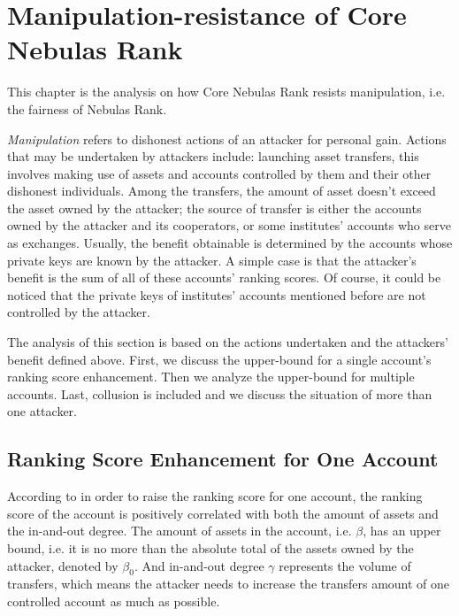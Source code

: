 
\section{Manipulation-resistance of Core Nebulas Rank}

This chapter is the analysis on how Core Nebulas Rank resists manipulation, i.e. the fairness of Nebulas Rank.

\emph{Manipulation} refers to dishonest actions of an attacker for personal gain. Actions that may be undertaken by attackers include: launching asset transfers, this involves making use of assets and accounts controlled by them and their other dishonest individuals. Among the transfers, the amount of asset doesn't exceed the asset owned by the attacker; the source of transfer is either the accounts owned by the attacker and its cooperators, or some institutes' accounts who serve as exchanges. Usually, the benefit obtainable is determined by the accounts whose private keys are known by the attacker. A simple case is that the attacker's benefit is the sum of all of these accounts' ranking scores. Of course, it could be noticed that the private keys of institutes' accounts mentioned before are not controlled by the attacker.

The analysis of this section is based on the actions undertaken and the attackers' benefit defined above. First, we discuss the upper-bound for a single account's ranking score enhancement. Then we analyze the upper-bound for multiple accounts. Last, collusion is included and we discuss the situation of more than one attacker.

\subsection{Ranking Score Enhancement for One Account \label{sec:cheat-single}}

According to  in order to raise the ranking score for one account, the ranking score of the account is positively correlated with both the amount of assets and the in-and-out degree. The amount of assets in the account, i.e. $\beta$, has an upper bound, i.e. it is no more than the absolute total of the assets owned by the attacker, denoted by $\beta_0$. And in-and-out degree $\gamma$ represents the volume of transfers, which means the attacker needs to increase the transfers amount of one controlled account as much as possible.

